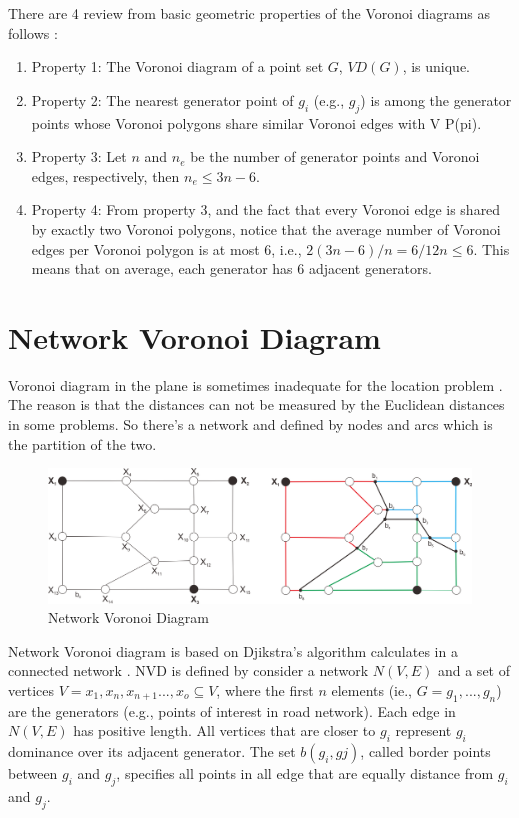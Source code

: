 There are 4 review from basic geometric properties of the Voronoi diagrams as follows \cite{kolah2004} :
\begin{enumerate}[label=- , leftmargin=*, topsep=5pt, itemsep=-1ex, partopsep=1ex, parsep=2ex]
	\item Property 1: The Voronoi diagram of a point set $G$, $VD(G)$, is unique.
	\item Property 2: The nearest generator point of $g_{i}$ (e.g., $g_{j}$) is among the generator points whose Voronoi polygons share similar Voronoi edges with V P(pi).
	\item Property 3: Let $n$ and $n_{e}$ be the number of generator points and Voronoi edges, respectively, then $n_{e} \leq 3n - 6$.
	\item Property 4: From property 3, and the fact that every Voronoi edge is shared by exactly two Voronoi polygons, notice that the average number of Voronoi edges per Voronoi polygon is at most 6, i.e., $2(3n-6)/n = 6/12n \leq 6$. This means that on average, each generator has 6 adjacent generators.
\end{enumerate}



\section{Network Voronoi Diagram}
Voronoi diagram in the plane is sometimes inadequate for the location problem \cite{takehiro2005}. The reason is that the distances can not be measured by the Euclidean distances in some problems. So there’s a network and defined by nodes and arcs which is the partition of the two.

\begin{figure}[H]
    \centering
    \includegraphics[scale=0.6]{network-voronoi-diagram.png}
    \caption{Network Voronoi Diagram}
    \label{fig:my_label}
\end{figure}    
    
\pagebreak
Network Voronoi diagram is based on Djikstra's algorithm calculates in  a connected network \cite{erwig2000}. NVD is defined by consider a network $N(V, E)$ and a set of vertices $V = {x_{1}, x_{n}, x_{n+1} ..., x_{o}} \subseteq V$, where the first $n$ elements (ie., $G = {g_{1}, ..., g_{n}}$) are the generators (e.g., points of interest in road network). Each edge in $N(V, E)$ has positive length. All vertices that are closer to $g_{i}$ represent $g_{i}$ dominance over its adjacent generator. The set $b(g_{i}, g{j})$, called border points between $g_{i}$ and $g_{j}$, specifies all points in all edge that are equally distance from $g_{i}$ and $g_{j}$.

